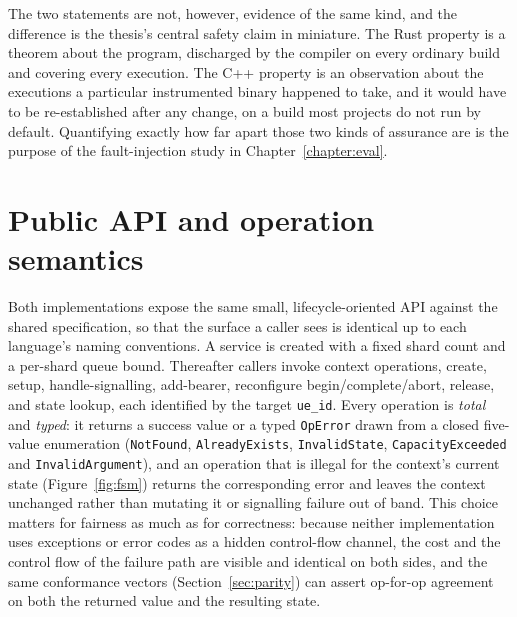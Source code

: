 \documentclass[english,twoside,openright,a4paper,censored,csm,software-track-2020]{HYthesisML}
\begin{document}
The two statements are not, however, evidence of the same kind, and the difference is the
thesis's central safety claim in miniature. The Rust property is a theorem about the program,
discharged by the compiler on every ordinary build and covering every execution. The C++
property is an observation about the executions a particular instrumented binary happened to
take, and it would have to be re-established after any change, on a build most projects do not
run by default. Quantifying exactly how far apart those two kinds of assurance are is the
purpose of the fault-injection study in Chapter~\ref{chapter:eval}.

\section{Public API and operation semantics}
Both implementations expose the same small, lifecycle-oriented API against the shared
specification, so that the surface a caller sees is identical up to each language's naming
conventions. A service is created with a fixed shard count and a per-shard queue bound.
Thereafter callers invoke context operations, create, setup, handle-signalling, add-bearer,
reconfigure begin/complete/abort, release, and state lookup, each identified by the target
\texttt{ue\_id}. Every operation is \emph{total} and \emph{typed}: it returns a success value or
a typed \texttt{OpError} drawn from a closed five-value enumeration (\texttt{NotFound},
\texttt{AlreadyExists}, \texttt{InvalidState}, \texttt{CapacityExceeded} and
\texttt{InvalidArgument}), and an operation that is illegal for the context's
current state (Figure~\ref{fig:fsm}) returns the corresponding error and leaves the context
unchanged rather than mutating it or signalling failure out of band. This choice matters for
fairness as much as for correctness: because neither implementation uses exceptions or error
codes as a hidden control-flow channel, the cost and the control flow of the failure path are
visible and identical on both sides, and the same conformance vectors (Section~\ref{sec:parity})
can assert op-for-op agreement on both the returned value and the resulting state.
\end{document}
